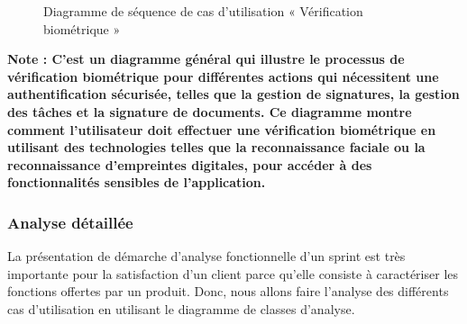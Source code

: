 \begin{figure}[H]
  \centering
  \caption{Diagramme de séquence de cas d'utilisation « Vérification biométrique »}
  \label{fig:sequence_verification_biometrique}
\end{figure}  
\textbf{Note : C'est un diagramme général qui illustre le processus de vérification biométrique pour différentes actions qui nécessitent une authentification sécurisée, telles que la gestion de signatures, la gestion des tâches et la signature de documents. Ce diagramme montre comment l'utilisateur doit effectuer une vérification biométrique en utilisant des technologies telles que la reconnaissance faciale ou la reconnaissance d'empreintes digitales, pour accéder à des fonctionnalités sensibles de l'application.}


\subsubsection{Analyse détaillée}
La présentation de démarche d'analyse fonctionnelle d'un sprint est très importante pour la satisfaction d'un client parce qu'elle consiste à caractériser les fonctions offertes par un produit.
Donc, nous allons faire l'analyse des différents cas d'utilisation en utilisant le diagramme de classes d'analyse.


\setlength{\parskip}{1em}
\setlength{\parindent}{0em}

